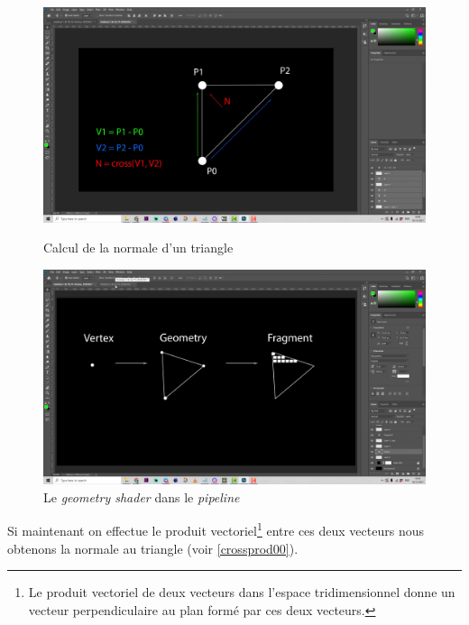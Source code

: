 \begin{figure}[h]
  \begin{minipage}[b]{0.45\linewidth}
    \centering
    \includegraphics[width=\linewidth]{images/shaders/norm00.png}
    \caption{Calcul de la normale d'un triangle}
    \label{norm00}
  \end{minipage}
  \hspace{0.1\linewidth} %
  \begin{minipage}[b]{0.45\linewidth}
    \centering
    \includegraphics[width=\linewidth]{images/shaders/norm01.png}
    \caption{Le \textit{geometry shader} dans le \textit{pipeline}}
    \label{norm01}
  \end{minipage}
\end{figure}

Si maintenant on effectue le produit vectoriel\footnote{Le produit vectoriel de deux vecteurs dans l'espace tridimensionnel donne un vecteur perpendiculaire au plan formé par ces deux vecteurs.} entre ces deux vecteurs nous obtenons la normale au triangle (voir \ref{crossprod00}).

